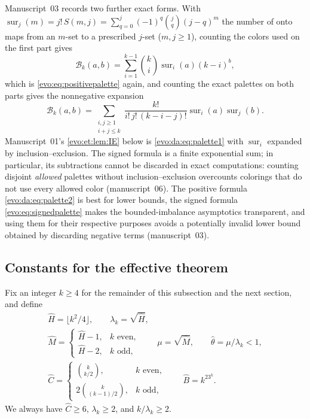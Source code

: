 \documentclass[11pt,a4paper]{article}
\numberwithin{equation}{section}
\theoremstyle{definition}
\theoremstyle{remark}
\newcommand{\Bip}{\mathcal B}
\newcommand{\sur}{\operatorname{sur}}
\begin{document}
Manuscript~03 records two further exact forms. With
$\sur_j(m)=j!\,S(m,j)=\sum_{q=0}^j(-1)^q\binom jq(j-q)^m$ the number of onto
maps from an $m$-set to a prescribed $j$-set ($m,j\ge1$), counting the colors
used on the first part gives
\begin{equation}\label{evo:da:eq:palette1}
 \Bip_k(a,b)=\sum_{i=1}^{k-1}\binom ki\sur_i(a)(k-i)^b,
\end{equation}
which is \eqref{evo:eq:positivepalette} again, and counting the exact palettes
on both parts gives the nonnegative expansion
\begin{equation}\label{evo:da:eq:palette2}
 \Bip_k(a,b)=
 \sum_{\substack{i,j\ge1\\i+j\le k}}
 \frac{k!}{i!\,j!\,(k-i-j)!}\sur_i(a)\sur_j(b).
\end{equation}
Manuscript~01's \cref{evo:et:lem:IE} below is \eqref{evo:da:eq:palette1} with
$\sur_i$ expanded by inclusion--exclusion. The signed formula is a finite
exponential sum; in particular, its subtractions cannot be discarded in exact
computations: counting disjoint \emph{allowed} palettes without
inclusion--exclusion overcounts colorings that do not use every allowed color
(manuscript~06). The positive formula \eqref{evo:da:eq:palette2} is best for
lower bounds, the signed formula \eqref{evo:eq:signedpalette} makes the
bounded-imbalance asymptotics transparent, and using them for their
respective purposes avoids a potentially invalid lower bound obtained by
discarding negative terms (manuscript~03).

\subsection{Constants for the effective theorem}

Fix an integer $k\ge4$ for the remainder of this subsection and the next
section, and define
\begin{equation}\label{evo:eq:constants}
\begin{gathered}
 \hat H=\lfloor k^2/4\rfloor,\qquad \lambda_k=\sqrt{\hat H},\\
 \hat M=\begin{cases}\hat H-1,&k\text{ even},\\ \hat H-2,&k\text{ odd},\end{cases}
 \qquad \mu=\sqrt{\hat M},\qquad \hat\theta=\mu/\lambda_k<1,\\
 \hat C=\begin{cases}\binom{k}{k/2},&k\text{ even},\\
                 2\binom{k}{(k-1)/2},&k\text{ odd},\end{cases}
 \qquad \hat B=k^23^k.
\end{gathered}
\end{equation}
We always have $\hat C\ge6$, $\lambda_k\ge2$, and $k/\lambda_k\ge2$.
\end{document}
